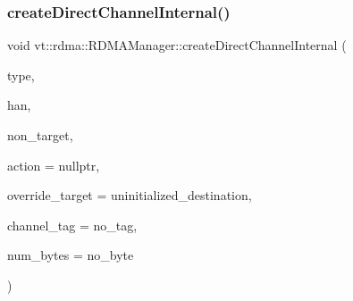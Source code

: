\subsubsection{\texorpdfstring{create\+Direct\+Channel\+Internal()}{createDirectChannelInternal()}}
{\footnotesize\ttfamily void vt\+::rdma\+::\+R\+D\+M\+A\+Manager\+::create\+Direct\+Channel\+Internal (\begin{DoxyParamCaption}\item[{\hyperlink{namespacevt_1_1rdma_ac848e1d9da43db6294bd06f83e5d3946}{R\+D\+M\+A\+\_\+\+Type\+Type} const \&}]{type,  }\item[{\hyperlink{namespacevt_a10442579ec4e7ebef223818e64bcf908}{R\+D\+M\+A\+\_\+\+Handle\+Type} const \&}]{han,  }\item[{\hyperlink{namespacevt_a866da9d0efc19c0a1ce79e9e492f47e2}{Node\+Type} const \&}]{non\+\_\+target,  }\item[{\hyperlink{namespacevt_ae0a5a7b18cc99d7b732cb4d44f46b0f3}{Action\+Type} const \&}]{action = {\ttfamily nullptr},  }\item[{\hyperlink{namespacevt_a866da9d0efc19c0a1ce79e9e492f47e2}{Node\+Type} const \&}]{override\+\_\+target = {\ttfamily uninitialized\+\_\+destination},  }\item[{\hyperlink{namespacevt_a84ab281dae04a52a4b243d6bf62d0e52}{Tag\+Type} const \&}]{channel\+\_\+tag = {\ttfamily no\+\_\+tag},  }\item[{\hyperlink{namespacevt_aab8d55968084610ce3b17057981e9300}{Byte\+Type} const \&}]{num\+\_\+bytes = {\ttfamily no\+\_\+byte} }\end{DoxyParamCaption})\hspace{0.3cm}{\ttfamily [private]}}

\mbox{\label{structvt_1_1rdma_1_1_r_d_m_a_manager_a51f828fcbb55e1b4c883746c490b77f0}} 
